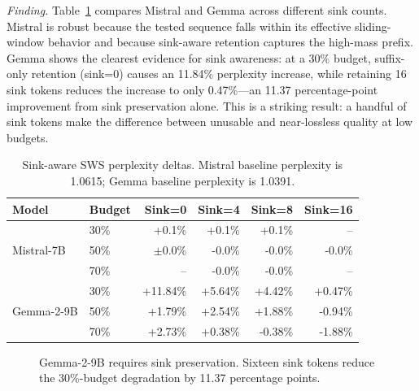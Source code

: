 \documentclass[11pt]{article}
\newcommand{\sws}{SWS}
\newcommand{\pct}{\%}
\theoremstyle{definition}
\theoremstyle{plain}
\begin{document}
\emph{Finding.}  Table~\ref{tab:sink-results} compares Mistral and Gemma across different sink counts.  Mistral is robust because the tested sequence falls within its effective sliding-window behavior and because sink-aware retention captures the high-mass prefix.  Gemma shows the clearest evidence for sink awareness: at a 30\pct{} budget, suffix-only retention (sink=0) causes an 11.84\pct{} perplexity increase, while retaining 16 sink tokens reduces the increase to only 0.47\pct{}---an 11.37 percentage-point improvement from sink preservation alone.  This is a striking result: a handful of sink tokens make the difference between unusable and near-lossless quality at low budgets.

\begin{table}[t]
\centering
\caption{Sink-aware \sws{} perplexity deltas.  Mistral baseline perplexity is 1.0615; Gemma baseline perplexity is 1.0391.}
\label{tab:sink-results}
\small
\begin{tabular}{llrrrr}
\toprule
Model & Budget & Sink=0 & Sink=4 & Sink=8 & Sink=16 \\
\midrule
\multirow{3}{*}{Mistral-7B} 
  & 30\pct{} & +0.1\pct{} & +0.1\pct{} & +0.1\pct{} & -- \\
  & 50\pct{} & $\pm$0.0\pct{} & -0.0\pct{} & -0.0\pct{} & -0.0\pct{} \\
  & 70\pct{} & -- & -0.0\pct{} & -0.0\pct{} & -- \\
\midrule
\multirow{3}{*}{Gemma-2-9B} 
  & 30\pct{} & +11.84\pct{} & +5.64\pct{} & +4.42\pct{} & +0.47\pct{} \\
  & 50\pct{} & +1.79\pct{} & +2.54\pct{} & +1.88\pct{} & -0.94\pct{} \\
  & 70\pct{} & +2.73\pct{} & +0.38\pct{} & -0.38\pct{} & -1.88\pct{} \\
\bottomrule
\end{tabular}
\end{table}

\begin{figure}[t]
\centering
{}
\caption{Gemma-2-9B requires sink preservation.  Sixteen sink tokens reduce the 30\pct{}-budget degradation by 11.37 percentage points.}
\label{fig:gemma-sink}
\end{figure}
\end{document}
